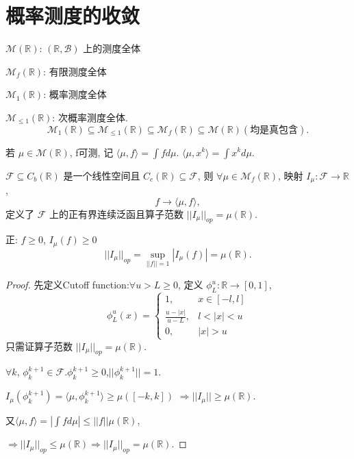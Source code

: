 \section{ 概率测度的收敛}
$\mathcal{M}(\mathbb{R})$: $(\mathbb{R}, \mathcal{B})$ 上的测度全体

$\mathcal{M}_f(\mathbb{R})$: 有限测度全体

$\mathcal{M}_1(\mathbb{R})$: 概率测度全体


$\mathcal{M}_{\le1}(\mathbb{R})$: 次概率测度全体.
\[ \mathcal{M}_1(\mathbb{R}) \subseteq \mathcal{M}_{\le1}(\mathbb{R}) \subseteq \mathcal{M}_f(\mathbb{R}) \subseteq \mathcal{M}(\mathbb{R})(\text{均是真包含}). \]

若 $\mu \in \mathcal{M}(\mathbb{R})$, f可测, 记 $\langle \mu, f \rangle = \int f d\mu$.
$\langle \mu, x^k \rangle = \int x^k d\mu$.

\begin{lemma}
     $\mathcal{F} \subseteq C_{b}(\mathbb{R})$ 是一个线性空间且 $C_c(\mathbb{R}) \subseteq \mathcal{F}$,
则 $\forall \mu \in \mathcal{M}_f(\mathbb{R})$, 映射 $I_\mu: \mathcal{F} \rightarrow \mathbb{R}$,
\[ f \rightarrow \langle \mu, f \rangle, \]
定义了 $\mathcal{F}$ 上的正有界连续泛函且算子范数 $||I_\mu||_{op} = \mu(\mathbb{R})$.

\end{lemma}
\begin{remark}
     正: $f \ge 0$, $I_{\mu}(f) \ge 0$
\[ ||I_\mu||_{op} =\sup_{||f||=1} |I_\mu(f)|= \mu(\mathbb{R}). \]

\end{remark}

\begin{proof}
    先定义Cutoff function:$\forall u > L \ge 0$, 定义
$\phi_{L}^{u}: \mathbb{R} \rightarrow [0,1]$,
\[
\phi_{L}^{u}(x) = 
\begin{cases} 
1, & x \in [-l,l] \\
\frac{u-|x|}{u-L}, & l < |x| < u \\
0, & |x| > u
\end{cases}
\]
只需证算子范数 $||I_\mu||_{op} = \mu(\mathbb{R})$.

$\forall k$, $\phi_{k}^{k+1} \in \mathcal{F}$.\quad $\phi_{k}^{k+1} \ge 0$,$||\phi_{k}^{k+1}|| = 1$.

$I_\mu(\phi_{k}^{k+1}) = \langle \mu, \phi_{k}^{k+1} \rangle \ge \mu([-k,k])$
$\Rightarrow ||I_{\mu}|| \ge \mu(\mathbb{R})$.

又$\langle \mu,f \rangle = |\int f d\mu| \le ||f|| \mu(\mathbb{R})$,

$\Rightarrow ||I_\mu||_{op} \le \mu(\mathbb{R})\Rightarrow ||I_\mu||_{op} = \mu(\mathbb{R})$.
\end{proof}



